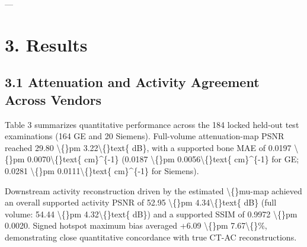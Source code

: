 \documentclass[11pt]{article}
\begin{document}
---\par

\section*{3. Results}
\subsection*{3.1 Attenuation and Activity Agreement Across Vendors}
Table 3 summarizes quantitative performance across the 184 locked held-out test examinations (164 GE and 20 Siemens). Full-volume attenuation-map PSNR reached 29.80 \textbackslash\{\}pm 3.22\textbackslash\{\}text\{ dB\}, with a supported bone MAE of 0.0197 \textbackslash\{\}pm 0.0070\textbackslash\{\}text\{ cm\}\textasciicircum{}\{-1\} (0.0187 \textbackslash\{\}pm 0.0056\textbackslash\{\}text\{ cm\}\textasciicircum{}\{-1\} for GE; 0.0281 \textbackslash\{\}pm 0.0111\textbackslash\{\}text\{ cm\}\textasciicircum{}\{-1\} for Siemens).\par

Downstream activity reconstruction driven by the estimated \textbackslash\{\}mu-map achieved an overall supported activity PSNR of 52.95 \textbackslash\{\}pm 4.34\textbackslash\{\}text\{ dB\} (full volume: 54.44 \textbackslash\{\}pm 4.32\textbackslash\{\}text\{ dB\}) and a supported SSIM of 0.9972 \textbackslash\{\}pm 0.0020. Signed hotspot maximum bias averaged +6.09 \textbackslash\{\}pm 7.67\textbackslash\{\}\%, demonstrating close quantitative concordance with true CT-AC reconstructions.\par
\end{document}
